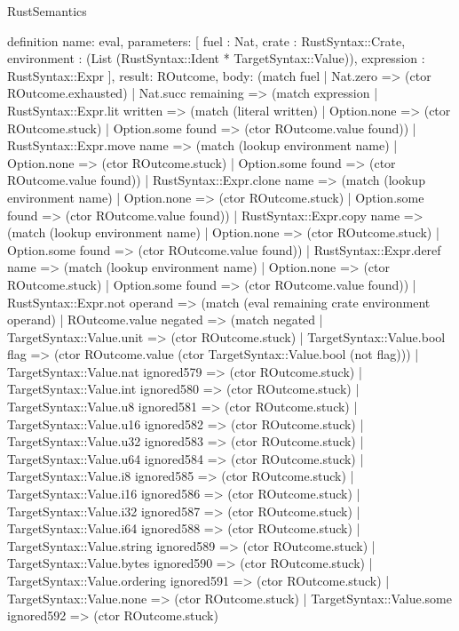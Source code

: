 \begin{lexlean}{RustSemantics}
\begin{semanticmodule}
definition{
  name: eval,
  parameters: [
    fuel : Nat,
    crate : RustSyntax::Crate,
    environment : (List (RustSyntax::Ident * TargetSyntax::Value)),
    expression : RustSyntax::Expr
  ],
  result: ROutcome,
  body: (match fuel
    | Nat.zero => (ctor ROutcome.exhausted)
    | Nat.succ remaining => (match expression
      | RustSyntax::Expr.lit written => (match (literal written)
        | Option.none => (ctor ROutcome.stuck)
        | Option.some found => (ctor ROutcome.value found))
      | RustSyntax::Expr.move name => (match (lookup environment name)
        | Option.none => (ctor ROutcome.stuck)
        | Option.some found => (ctor ROutcome.value found))
      | RustSyntax::Expr.clone name => (match (lookup environment name)
        | Option.none => (ctor ROutcome.stuck)
        | Option.some found => (ctor ROutcome.value found))
      | RustSyntax::Expr.copy name => (match (lookup environment name)
        | Option.none => (ctor ROutcome.stuck)
        | Option.some found => (ctor ROutcome.value found))
      | RustSyntax::Expr.deref name => (match (lookup environment name)
        | Option.none => (ctor ROutcome.stuck)
        | Option.some found => (ctor ROutcome.value found))
      | RustSyntax::Expr.not operand => (match (eval remaining crate environment operand)
        | ROutcome.value negated => (match negated
          | TargetSyntax::Value.unit => (ctor ROutcome.stuck)
          | TargetSyntax::Value.bool flag => (ctor ROutcome.value (ctor TargetSyntax::Value.bool (not flag)))
          | TargetSyntax::Value.nat ignored579 => (ctor ROutcome.stuck)
          | TargetSyntax::Value.int ignored580 => (ctor ROutcome.stuck)
          | TargetSyntax::Value.u8 ignored581 => (ctor ROutcome.stuck)
          | TargetSyntax::Value.u16 ignored582 => (ctor ROutcome.stuck)
          | TargetSyntax::Value.u32 ignored583 => (ctor ROutcome.stuck)
          | TargetSyntax::Value.u64 ignored584 => (ctor ROutcome.stuck)
          | TargetSyntax::Value.i8 ignored585 => (ctor ROutcome.stuck)
          | TargetSyntax::Value.i16 ignored586 => (ctor ROutcome.stuck)
          | TargetSyntax::Value.i32 ignored587 => (ctor ROutcome.stuck)
          | TargetSyntax::Value.i64 ignored588 => (ctor ROutcome.stuck)
          | TargetSyntax::Value.string ignored589 => (ctor ROutcome.stuck)
          | TargetSyntax::Value.bytes ignored590 => (ctor ROutcome.stuck)
          | TargetSyntax::Value.ordering ignored591 => (ctor ROutcome.stuck)
          | TargetSyntax::Value.none => (ctor ROutcome.stuck)
          | TargetSyntax::Value.some ignored592 => (ctor ROutcome.stuck)
}
\end{semanticmodule}
\end{lexlean}
